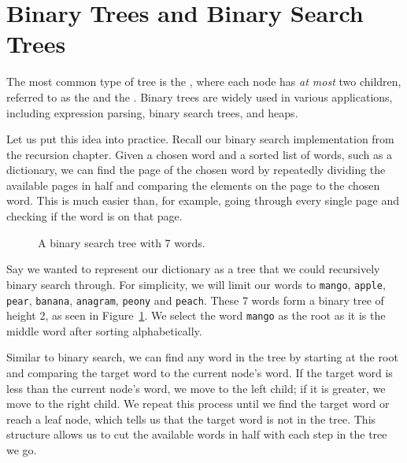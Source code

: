 \section{Binary Trees and Binary Search Trees}
The most common type of tree is the , where each node has \emph{at most} two children, referred to as the  and the . Binary trees are widely used in various applications, including expression parsing, binary search trees, and heaps.

Let us put this idea into practice. Recall our binary search implementation from the recursion chapter. Given a chosen word and a sorted list of words, such as a dictionary, we can find the page of the chosen word by repeatedly dividing the available pages in half and comparing the elements on the page to the chosen word. This is much easier than, for example, going through every single page and checking if the word is on that page.


\begin{figure}
  \centering
  \caption{A binary search tree with 7 words.}
  \label{fig:bst1}
\end{figure}
Say we wanted to represent our dictionary as a tree that we could recursively binary search through. For simplicity, we will limit our words to \texttt{mango}, \texttt{apple}, \texttt{pear}, \texttt{banana}, \texttt{anagram}, \texttt{peony} and \texttt{peach}. These 7 words form a binary tree of height 2, as seen in Figure~\ref{fig:bst1}. We select the word \texttt{mango} as the root as it is the middle word after sorting alphabetically.

Similar to binary search, we can find any word in the tree by starting at the root and comparing the target word to the current node's word. If the target word is less than the current node's word, we move to the left child; if it is greater, we move to the right child. We repeat this process until we find the target word or reach a leaf node, which tells us that the target word is not in the tree. This structure allows us to cut the available words in half with each step in the tree we go.

